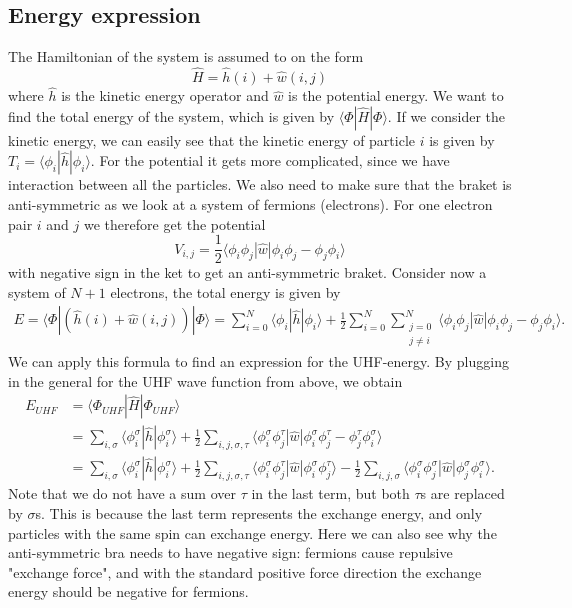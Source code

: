 \documentclass[norsk,a4paper,12pt]{article}
\begin{document}
\subsection{Energy expression}
The Hamiltonian of the system is assumed to on the form
\begin{equation}
\hat{H}=\hat{h}(i) + \hat{w}(i,j)
\end{equation}
where $\hat{h}$ is the kinetic energy operator and $\hat{w}$ is the potential energy. We want to find the total energy of the system, which is given by $\langle \Phi|\hat{H}|\Phi\rangle$. If we consider the kinetic energy, we can easily see that the kinetic energy of particle $i$ is given by $T_i=\langle\phi_i|\hat{h}|\phi_i\rangle$. For the potential it gets more complicated, since we have interaction between all the particles. We also need to make sure that the braket is anti-symmetric as we look at a system of fermions (electrons). For one electron pair $i$ and $j$ we therefore get the potential 
\begin{equation*}
V_{i,j}=\frac{1}{2}\langle\phi_i\phi_j|\hat{w}|\phi_i\phi_j-\phi_j\phi_i\rangle
\end{equation*}
with negative sign in the ket to get an anti-symmetric braket. Consider now a system of $N+1$ electrons, the total energy is given by
\begin{equation*}
\begin{split}
E=\langle\Phi|(\hat{h}(i) + \hat{w}(i,j))|\Phi\rangle
=\sum_{i=0}^N\langle\phi_i|\hat{h}|\phi_i\rangle+\frac{1}{2}\sum_{i=0}^N\sum_{\substack{j=0\\j\neq i}}^N\langle\phi_i\phi_j|\hat{w}|\phi_i\phi_j-\phi_j\phi_i\rangle.
\end{split}
\end{equation*}
We can apply this formula to find an expression for the UHF-energy. By plugging in the general for the UHF wave function from above, we obtain
\begin{align}
E_{UHF}&=\langle \Phi_{UHF}|\hat{H}|\Phi_{UHF}\rangle\\
&=\sum_{i,\sigma}\langle\phi_i^{\sigma}|\hat{h}|\phi_i^{\sigma}\rangle+\frac{1}{2}\sum_{i,j,\sigma,\tau}\langle\phi_i^{\sigma}\phi_j^{\tau}|\hat{w}|\phi_i^{\sigma}\phi_j^{\tau}-\phi_j^{\tau}\phi_i^{\sigma}\rangle\\
&=\sum_{i,\sigma}\langle\phi_i^{\sigma}|\hat{h}|\phi_i^{\sigma}\rangle+\frac{1}{2}\sum_{i,j,\sigma,\tau}\langle\phi_i^{\sigma}\phi_j^{\tau}|\hat{w}|\phi_i^{\sigma}\phi_j^{\tau}\rangle-\frac{1}{2}\sum_{i,j,\sigma}\langle\phi_i^{\sigma}\phi_j^{\sigma}|\hat{w}|\phi_j^{\sigma}\phi_i^{\sigma}\rangle.
\end{align}
Note that we do not have a sum over $\tau$ in the last term, but both $\tau$s are replaced by $\sigma$s. This is because the last term represents the exchange energy, and only particles with the same spin can exchange energy. Here we can also see why the anti-symmetric bra needs to have negative sign: fermions cause repulsive "exchange force", and with the standard positive force direction the exchange energy should be negative for fermions. 
\end{document}
